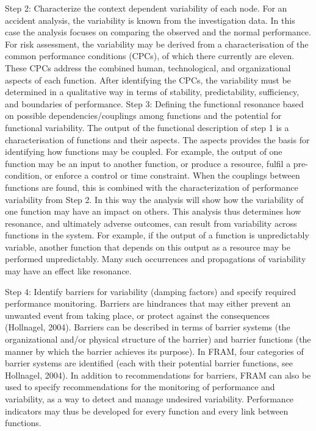 Step 2: Characterize the context dependent variability of each node. For an accident analysis,
the variability is known from the investigation data. In this case the analysis focuses on
comparing the observed and the normal performance. For risk assessment, the variability may
be derived from a characterisation of the common performance conditions (CPCs), of which
there currently are eleven. These CPCs address the combined human, technological, and
organizational aspects of each function. After identifying the CPCs, the variability must be
determined in a qualitative way in terms of stability, predictability, sufficiency, and
boundaries of performance.
Step 3: Defining the functional resonance based on possible dependencies/couplings among
functions and the potential for functional variability. The output of the functional description
of step 1 is a characterisation of functions and their aspects. The aspects provides the basis for
identifying how functions may be coupled. For example, the output of one function may be an
input to another function, or produce a resource, fulfil a pre-condition, or enforce a control or
time constraint. When the couplings between functions are found, this is combined with the
characterization of performance variability from Step 2. In this way the analysis will show
how the variability of one function may have an impact on others. This analysis thus
determines how resonance, and ultimately adverse outcomes, can result from variability
across functions in the system. For example, if the output of a function is unpredictably
variable, another function that depends on this output as a resource may be performed
unpredictably. Many such occurrences and propagations of variability may have an effect like
resonance.

Step 4: Identify barriers for variability (damping factors) and specify required performance
monitoring. Barriers are hindrances that may either prevent an unwanted event from taking
place, or protect against the consequences (Hollnagel, 2004). Barriers can be described in
terms of barrier systems (the organizational and/or physical structure of the barrier) and
barrier functions (the manner by which the barrier achieves its purpose). In FRAM, four
categories of barrier systems are identified (each with their potential barrier functions, see
Hollnagel, 2004). In addition to recommendations for barriers, FRAM can also be used to
specify recommendations for the monitoring of performance and variability, as a way to
detect and manage undesired variability. Performance indicators may thus be developed for
every function and every link between functions.


